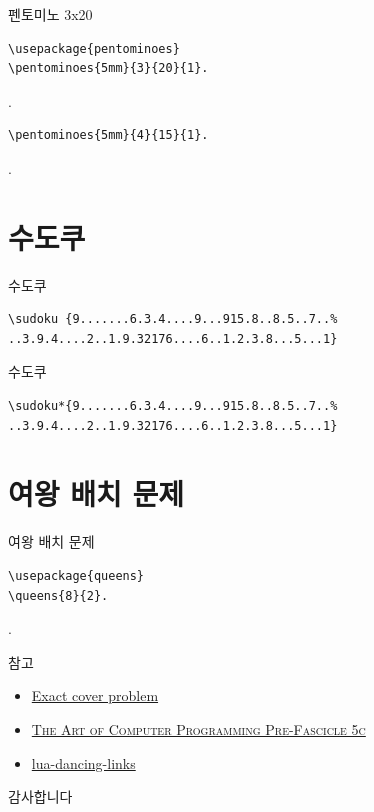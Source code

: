 \documentclass[xcolor=svgnames]{beamer}
\begin{document}
%
\begin{frame}[fragile]{펜토미노 3x20}
\begin{verbatim}
\usepackage{pentominoes}
\pentominoes{5mm}{3}{20}{1}.
\end{verbatim}
.
\begin{verbatim}
\pentominoes{5mm}{4}{15}{1}.
\end{verbatim}
.
\end{frame}


\section{수도쿠}

%
\begin{frame}[fragile]{수도쿠}
\begin{verbatim}
\sudoku {9.......6.3.4....9...915.8..8.5..7..%
..3.9.4....2..1.9.32176....6..1.2.3.8...5...1}
\end{verbatim}  
\begin{center}
\end{center}
\end{frame}

%
\begin{frame}[fragile]{수도쿠}
\begin{verbatim}
\sudoku*{9.......6.3.4....9...915.8..8.5..7..%
..3.9.4....2..1.9.32176....6..1.2.3.8...5...1}
\end{verbatim}
\begin{center}
\end{center}
\end{frame}


\section{여왕 배치 문제}

%
\begin{frame}[fragile]{여왕 배치 문제}
\begin{verbatim}
\usepackage{queens}
\queens{8}{2}.
\end{verbatim}
\vspace{-10mm}
.
\end{frame}


%
\begin{frame}{참고}
  \begin{itemize}
  \item \href{https://en.wikipedia.org/wiki/Exact_cover}{Exact cover problem}
  \item \href{http://www-cs-faculty.stanford.edu/~knuth/fasc5c.ps.gz}
    {\textsc{The Art of Computer Programming Pre-Fascicle 5c}}
  \item \href{https://github.com/sjnam/lua-dancing-links}
    {lua-dancing-links}
  \end{itemize}
\end{frame}

%
\begin{frame}[standout]
  감사합니다
\end{frame}
\end{document}
